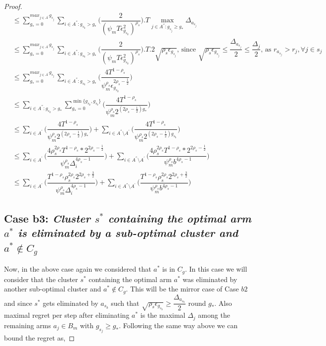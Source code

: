 \begin{proof}
\begin{align*}
 &\leq\sum_{g_{*}=0}^{max_{j\in A^{'}}g_{s_{j}}}\sum_{i\in A^{''}:g_{s_{k}}>g_{*}}\bigg(\dfrac{2}{(\psi_{m}T\epsilon_{g_{s_{k}}}^{2})^{\rho_{s}}} \bigg).T\max_{j\in A^{''}:g_{s_{j}}\geq g_{*}}{\Delta}_{a_{s_{j}}}\\
 &\leq\sum_{g_{*}=0}^{max_{j\in A^{'}}g_{s_{j}}}\sum_{i\in A^{''}:g_{s_{k}}>g_{*}}\bigg(\dfrac{2}{(\psi_{m}T\epsilon_{g_{s_{k}}}^{2})^{\rho_{s}}} \bigg).T.2\sqrt{\rho_{s}\epsilon_{g_{s_{j}}}} \text{, since }\sqrt{\rho_{s}\epsilon_{g_{s_{j}}}}\leq\dfrac{\Delta_{a_{s_{j}}}}{2}\leq  \dfrac{\Delta_{j}}{2}\text{, as }{r}_{a_{s_{j}}}>{r}_{j},\forall j\in s_{j}\\
 &\leq\sum_{g_{*}=0}^{max_{j\in A^{'}}g_{s_{j}}}\sum_{i\in A^{''}:g_{s_{k}}>g_{*}}\bigg(\dfrac{4T^{1-\rho_{s}}}{\psi_{m}^{\rho_{s}}\epsilon_{g_{s_{k}}}^{2\rho_{s} - \frac{1}{2}}} \bigg)\\
 &\leq\sum_{i\in A^{''}:g_{s_{k}}>g_{*}}\sum_{g_{*}=0}^{\min{\lbrace g_{s_{k}},g_{s_{b}}\rbrace}}\bigg(\dfrac{4T^{1-\rho_{s}}}{\psi_{m}^{\rho_{s}}2^{({2\rho_{s} - \frac{1}{2}})g_{*}}} \bigg) \\
 &\leq\sum_{i\in A^{'}}\bigg(\dfrac{4T^{1-\rho_{s}}}{\psi_{m}^{\rho_{s}}2^{({2\rho_{s} - \frac{1}{2}})g_{*}}} \bigg)+\sum_{i\in A^{''}\setminus A^{'}}\bigg(\dfrac{4T^{1-\rho_{s}}}{\psi_{m}^{\rho_{s}}2^{({2\rho_{s} - \frac{1}{2}})g_{s_{b}}}} \bigg)\\ 
 &\leq\sum_{i\in A^{'}}\bigg(\dfrac{4\rho_{s}^{2\rho_{s}}T^{1-\rho_{s}}*2^{2\rho_{s}-\frac{1}{2}}}{\psi_{m}^{\rho_{s}}\Delta_{i}^{4\rho_{s}-1}} \bigg)+\sum_{i\in A^{''}\setminus A^{'}}\bigg(\dfrac{4\rho_{s}^{2\rho_{s}}T^{1-\rho_{s}}*2^{2\rho_{s}-\frac{1}{2}}}{\psi_{m}^{\rho_{s}}b^{4\rho_{s}-1}} \bigg)\\
 &\leq\sum_{i\in A^{'}}\bigg(\dfrac{T^{1-\rho_{s}}\rho_{s}^{2\rho_{s}}2^{2\rho_{s}+\frac{3}{2}}}{\psi_{m}^{\rho_{s}}\Delta_{i}^{4\rho_{s}-1}} \bigg)+\sum_{i\in A^{''}\setminus A^{'}}\bigg(\dfrac{T^{1-\rho_{s}}\rho_{s}^{2\rho_{s}}2^{2\rho_{s}+\frac{3}{2}}}{\psi_{m}^{\rho_{s}}b^{4\rho_{s}-1}} \bigg)
\end{align*}


\subsection*{Case b3: \textit{Cluster $s^{*}$ containing the optimal arm $a^{*}$ is eliminated by a sub-optimal cluster and $a^{*}\notin C_{g}$}}
 
	Now, in the above case again we considered that $a^{*}$ is in $C_{g}$. In this case we will consider that the cluster $s^{*}$ containing the optimal arm $a^{*}$ was eliminated by another sub-optimal cluster and $a^{*}\notin C_{g}$. This will be the mirror case of Case $b2$ and since $s^{*}$ gets eliminated by $a_{s_{b}}$ such that $\sqrt{\rho_{s}\epsilon_{g_{s_{b}}}}\geq\dfrac{\Delta_{a_{s_{b}}}}{2}$ round $g_{*}$. Also maximal regret per step after eliminating $a^{*}$ is the maximal $\Delta_{j}$ among the remaining arms $a_{j}\in B_{m}$ with $g_{s_{j}}\geq g_{*}$. Following the same way above we can bound the regret as,
 

\end{proof}
